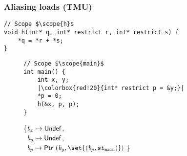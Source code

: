 

\begin{frame}[fragile]
\frametitle{Aliasing loads (TMU)}
\begin{verbatim}
// Scope $\scope{h}$
void h(int* q, int* restrict r, int* restrict s) {
    *q = *r + *s; 
}
\end{verbatim}

\begin{figure}[h]
\centering
\begin{minipage}{.36\textwidth}
\begin{verbatim}
// Scope $\scope{main}$
int main() {
    int x, y;
    |\colorbox{red!20}{int* restrict p = &y;}|
    *p = 0;
    h(&x, p, p);
}
\end{verbatim}
\end{minipage}%
\begin{minipage}{.64\textwidth}
\executionannotation
{
\{$\textit{b}_x \mapsto \mathsf{Undef}$, \\
    \ $\textit{b}_y \mapsto \mathsf{Undef}$, \\
    \ \colorbox{red!20}{$\Blockvar_p \mapsto \ptr{(\Blockvar_y, \set{(\Blockvar_p, \scope{main})})}$}
\}
}
{
}
\end{minipage}
\end{figure}


\end{frame}




